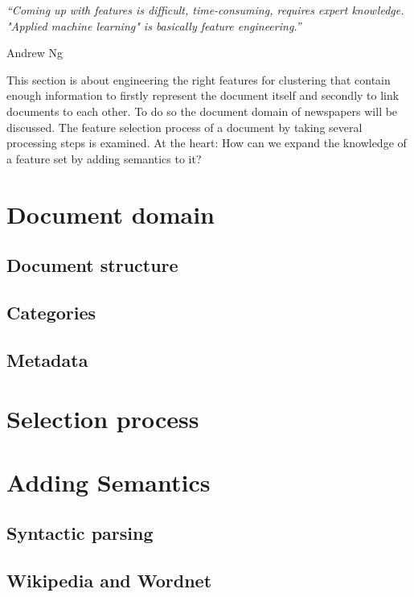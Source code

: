 \epigraph{\emph{
  ``Coming up with features is difficult, time-consuming, requires expert knowledge. "Applied machine learning" is basically feature engineering.''
}}{ Andrew Ng }

This section is about engineering the right features for clustering that contain enough information to firstly represent the document itself and secondly to link documents to each other. To do so the document domain of newspapers will be discussed. 
The feature selection process of a document by taking several processing steps is examined.
At the heart: How can we expand the knowledge of a feature set by adding semantics to it?

\section{Document domain}
  \subsection{Document structure}
  \subsection{Categories}
  \subsection{Metadata}

\section{Selection process}

\section{Adding Semantics}
  \subsection{Syntactic parsing}
  \subsection{Wikipedia and Wordnet}